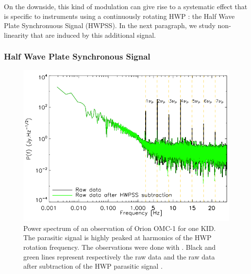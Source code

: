 On the downside, this kind of modulation can give rise to a systematic effect that is specific to instruments using a continuously rotating HWP : the Half Wave Plate Synchronuous Signal (HWPSS). In the next paragraph, we study non-linearity that are induced by this additional signal.

\subsubsection{Half Wave Plate Synchronous Signal}

\begin{figure}[h]
\center
\includegraphics[clip, angle=0, width=\columnwidth]{Figures/hwp_power_spectrum.png}
\caption{Power spectrum of an observation of Orion OMC-1 for one KID. The parasitic signal is highly peaked at harmonics of the HWP rotation frequency. The observations were done with \nika . Black and green lines represent respectively the raw data and the raw data after subtraction of the HWP parasitic signal \citep{2017A&A...599A..34R}. }
\label{fig:hwp_power_spectrum}
\end{figure}

